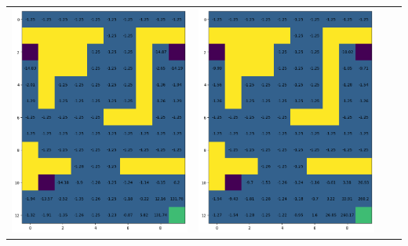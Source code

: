 \begin{landscape}
\begin{center}
\begin{tabular}{c || c  c  c}
            \includegraphics[width=0.35\textheight]{assets/dp/analysis/prob_0.25_gamma_0.2_value.png}
        & 
            \includegraphics[width=0.35\textheight]{assets/dp/analysis/prob_0.5_gamma_0.2_value.png}

\end{tabular}
\end{center}
\end{landscape}
